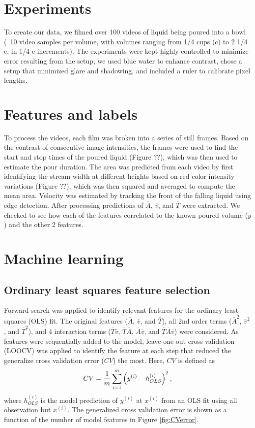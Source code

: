 \documentclass[twocolumn]{article}
\begin{document}
\section{Experiments}
To create our data, we filmed over 100 videos of liquid being poured into a bowl (~10 video samples per volume, with volumes ranging from 1/4 cups (c) to 2 1/4 c, in 1/4 c increments). The experiments were kept highly controlled to minimize error resulting from the setup; we used blue water to enhance contrast, chose a setup that minimized glare and shadowing, and included a ruler to calibrate pixel lengths. 

\section{Features and labels}
To process the videos, each film was broken into a series of still frames. Based on the contrast of consecutive image intensities, the frames were used to find the start and stop times of the poured liquid (Figure ??), which was then used to estimate the pour duration. The area was predicted from each video by first identifying the stream width at different heights based on red color intensity variations (Figure ??), which was then squared and averaged to compute the mean area. Velocity was estimated by tracking the front of the falling liquid using edge detection. After processing predictions of $\overline{A}$, $\overline{v}$, and $\overline{T}$ were extracted. We checked to see how each of the features correlated to the known poured volume ($y$) and the other 2 features.

\section{Machine learning}
\subsection{Ordinary least squares feature selection}
Forward search was applied to identify relevant features for the ordinary least squares (OLS) fit. The original features ($\overline{A}$, $\overline{v}$, and $\overline{T}$), all 2nd order terms ($\overline{A}^2$, $\overline{v}^2$, and $\overline{T}^2$), and 4 interaction terms ($\overline{T} \overline{v}$, $\overline{T} \overline{A}$, $\overline{A} \overline{v}$, and $\overline{T} \overline{A} \overline{v}$) were considered. As features were sequentially added to the model, leave-one-out cross validation (LOOCV) was applied to identify the feature at each step that reduced the generalize cross validation error ($CV$) the most. Here, $CV$ is defined as
\begin{equation} \label{eq:2}
CV = \frac{1}{m} \sum^{m}_{i=1} \left( y^{(i)}-h^{(i)}_{OLS} \right)^{2} \\,
\end{equation}
where $h^{(i)}_{OLS}$ is the model prediction of $y^{(i)}$ at $x^{(i)}$ from an OLS fit using all observation but $x^{(i)}$. The generalized cross validation error is shown as a function of the number of model features in Figure \ref{fig:CVerror}. 
\end{document}
